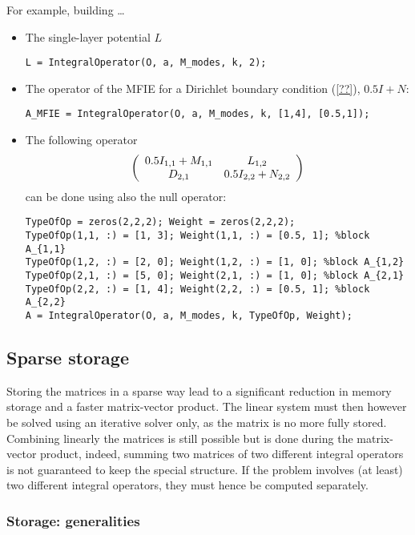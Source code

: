 For example, building \ldots 
\begin{itemize}
\item The single-layer potential $L$
\begin{verbatim}
L = IntegralOperator(O, a, M_modes, k, 2);
\end{verbatim}
\item The operator of the MFIE for a Dirichlet boundary condition (\ref{??}), $0.5I + N$:
\begin{verbatim}
A_MFIE = IntegralOperator(O, a, M_modes, k, [1,4], [0.5,1]);
\end{verbatim}
\item The following operator
$$
\left(\begin{array}{c c}
0.5 I_{1,1}+ M_{1,1} & L_{1,2}\\
D_{2,1} & 0.5 I_{2,2}+N_{2,2}
\end{array}\right)
$$
can be done using also the null operator:
\begin{verbatim}
TypeOfOp = zeros(2,2,2); Weight = zeros(2,2,2);
TypeOfOp(1,1, :) = [1, 3]; Weight(1,1, :) = [0.5, 1]; %block A_{1,1}
TypeOfOp(1,2, :) = [2, 0]; Weight(1,2, :) = [1, 0]; %block A_{1,2}
TypeOfOp(2,1, :) = [5, 0]; Weight(2,1, :) = [1, 0]; %block A_{2,1}
TypeOfOp(2,2, :) = [1, 4]; Weight(2,2, :) = [0.5, 1]; %block A_{2,2}
A = IntegralOperator(O, a, M_modes, k, TypeOfOp, Weight);
\end{verbatim}
\end{itemize}

\subsection{Sparse storage}

Storing the matrices in a sparse way lead to a significant reduction in memory storage and a faster matrix-vector product. The linear system must then however be solved using an iterative solver only, as the matrix is no more fully stored. Combining linearly the matrices is still possible but is done during the matrix-vector product, indeed, summing two matrices of two different integral operators is not guaranteed to keep the special structure. If the problem involves (at least) two different integral operators, they must hence be computed separately.

\subsubsection{Storage: generalities}

